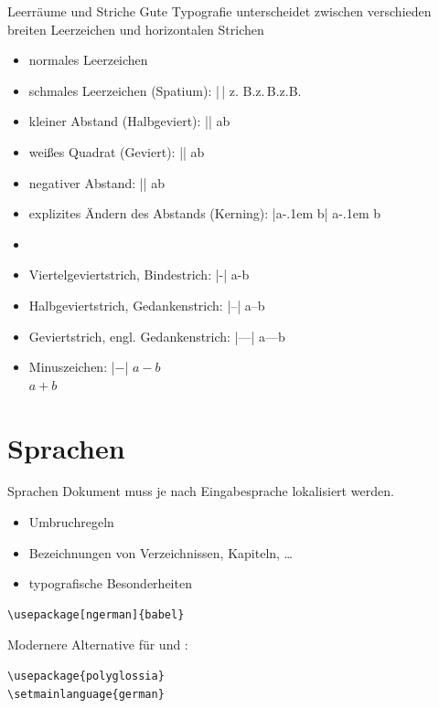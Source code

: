 \documentclass[
	vorläufig=true,
	datum=2016-10-28,
	titel={Allgemeine Formatierung und Pakete},
	web=true,
]{../tex/latexkurs-slides}
\begin{document}
\begin{frame}[fragile]{Leerräume und Striche}
	Gute Typografie unterscheidet zwischen verschieden breiten Leerzeichen und horizontalen Strichen
			\begin{itemize}
				\item normales Leerzeichen
				\item schmales Leerzeichen (Spatium): |\,| \hfill z. B.\quad z.\,B.\quad z.B.
				\item kleiner Abstand (Halbgeviert): |\enskip| \hfill a\enskip b
				\item weißes Quadrat (Geviert): |\quad| \hfill a\quad b
				\item negativer Abstand: |\!| \hfill a\!b
				\pause
				\item explizites Ändern des Abstands (Kerning): |a\kern-.1em b| \hfill a\kern-.1em b
				\item[] \pause
				\item Viertelgeviertstrich, Bindestrich: |-| \hfill a-b
				\item Halbgeviertstrich, Gedankenstrich: |--| \hfill a–b
				\item Geviertstrich, engl. Gedankenstrich: |---| \hfill a—b
				\item Minuszeichen: |$-$| \hfill $a-b$\\\hfill $a+b$
			\end{itemize}
\end{frame}

\section{Sprachen}
\begin{frame}[fragile]{Sprachen}
Dokument muss je nach Eingabesprache lokalisiert werden.
\begin{itemize}
	\item Umbruchregeln
	\item Bezeichnungen von Verzeichnissen, Kapiteln, …
	\item typografische Besonderheiten
\end{itemize}
\begin{lstlisting}
\usepackage[ngerman]{babel}
\end{lstlisting}
\pause
\vfill
Modernere Alternative für  und \XeLaTeX:
\begin{lstlisting}
\usepackage{polyglossia}
\setmainlanguage{german}
\end{lstlisting}
\end{frame}
\end{document}
